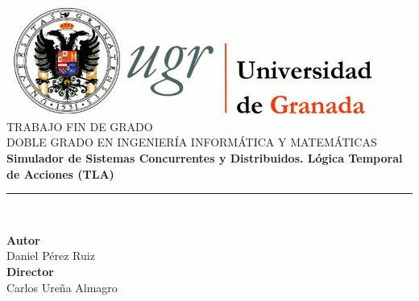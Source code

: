 \begin{titlepage}
\newlength{\centeroffset}
\setlength{\centeroffset}{-0.5\oddsidemargin}
\addtolength{\centeroffset}{0.5\evensidemargin}
\thispagestyle{empty}

\noindent\hspace*{\centeroffset}\begin{minipage}{\textwidth}

\centering
\includegraphics[width=0.9\textwidth]{logos/logo_ugr.jpg}\\[1.4cm]

\textsc{ \Large TRABAJO FIN DE GRADO\\[0.2cm]}
\small \textsc{DOBLE GRADO EN INGENIERÍA INFORMÁTICA Y MATEMÁTICAS}\\[1cm]

{\huge\bfseries Simulador de Sistemas Concurrentes y Distribuidos. Lógica Temporal de Acciones (TLA) \\}
\noindent\rule[-1ex]{\textwidth}{3pt}\\[3.5ex]
\end{minipage}

\vspace{0.5cm}
\noindent\hspace*{\centeroffset}
\begin{minipage}{\textwidth}
\centering

\textbf{Autor}\\ {Daniel Pérez Ruiz}\\[2.5ex]
\textbf{Director}\\ {Carlos Ureña Almagro}\\[1.2cm]


\end{minipage}
\end{titlepage}
